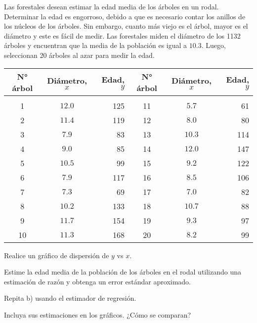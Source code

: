 \addpoints
\question Las forestales desean estimar la edad media de los árboles en un rodal. Determinar la edad es engorroso, debido a que es necesario contar los anillos de los núcleos de los árboles. Sin embargo, cuanto más viejo es el árbol, mayor es el diámetro y este es fácil de medir. Las forestales miden el diámetro de los 1132 árboles y encuentran que la media de la población es igual a $10.3$.  Luego, seleccionan 20 árboles al azar para medir la edad.

\begin{center}
\begin{tabular}{ccrccr} 
N° árbol & Diámetro, $x$ & Edad, $y$ & N° árbol & Diámetro, $x$ & Edad, $y$ \\
\hline & & & & & \\
1 & $12.0$ & 125 & 11 & $5.7$ & 61 \\
2 & $11.4$ & 119 & 12 & $8.0$ & 80 \\
3 & $7.9$ & 83 & 13 & $10.3$ & 114 \\
4 & $9.0$ & 85 & 14 & $12.0$ & 147 \\
5 & $10.5$ & 99 & 15 & $9.2$ & 122 \\
6 & $7.9$ & 117 & 16 & $8.5$ & 106 \\
7 & $7.3$ & 69 & 17 & $7.0$ & 82 \\
8 & $10.2$ & 133 & 18 & $10.7$ & 88 \\
9 & $11.7$ & 154 & 19 & $9.3$ & 97 \\
10 & $11.3$ & 168 & 20 & $8.2$ & 99
\end{tabular}
\end{center}
\noaddpoints
\begin{parts}
\item Realice un gráfico de dispersión de $y$ vs $x$.
\item Estime la edad media de la población de los árboles en el rodal utilizando una estimación
de razón y obtenga un error estándar aproximado.
\item Repita b) usando el estimador de regresión.
\item Incluya sus estimaciones en los gráficos. ¿Cómo se comparan?
\end{parts}